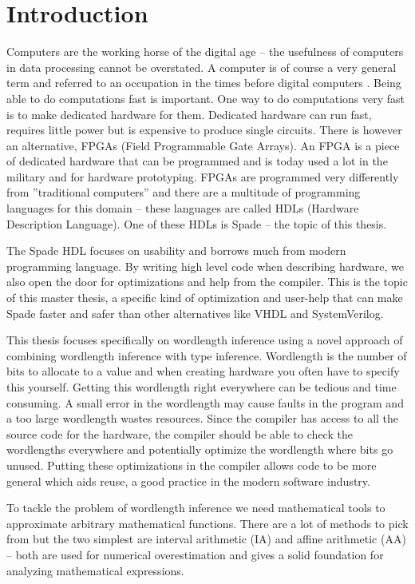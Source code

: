 \chapter{Introduction}
\label{chaIntro}
Computers are the working horse of the digital age -- the usefulness of computers in data processing cannot be overstated. A computer is of course a very general term and referred to an occupation in the times before digital computers \cite{src:ComputerOccupation}. Being able to do computations fast is important. One way to do computations very fast is to make dedicated hardware for them. Dedicated hardware can run fast, requires little power but is expensive to produce single circuits. There is however an alternative, FPGAs (Field Programmable Gate Arrays). An FPGA is a piece of dedicated hardware that can be programmed and is today used a lot in the military and for hardware prototyping. FPGAs are programmed very differently from ''traditional computers'' and there are a multitude of programming languages for this domain -- these languages are called HDLs (Hardware Description Language). One of these HDLs is Spade -- the topic of this thesis.

The Spade HDL focuses on usability and borrows much from modern programming language\cite{src:spadeSomething, src:spadeAnHDL}. By writing high level code when describing hardware, we also open the door for optimizations and help from the compiler. This is the topic of this master thesis, a specific kind of optimization and user-help that can make Spade faster and safer than other alternatives like VHDL and SystemVerilog.

This thesis focuses specifically on wordlength inference using a novel approach of combining wordlength inference with type inference. Wordlength is the number of bits to allocate to a value and when creating hardware you often have to specify this yourself. Getting this wordlength right everywhere can be tedious and time consuming. A small error in the wordlength may cause faults in the program and a too large wordlength wastes resources.
Since the compiler has access to all the source code for the hardware, the compiler should be able to check the wordlengths everywhere and potentially optimize the wordlength where bits go unused. Putting these optimizations in the compiler allows code to be more general which aids reuse, a good practice in the modern software industry. 

To tackle the problem of wordlength inference we need mathematical tools to approximate arbitrary mathematical functions. There are a lot of methods to pick from but the two simplest are interval arithmetic (IA)\cite{src:affAri} and affine arithmetic (AA)\cite{src:affAri} -- both are used for numerical overestimation and gives a solid foundation for analyzing mathematical expressions.

